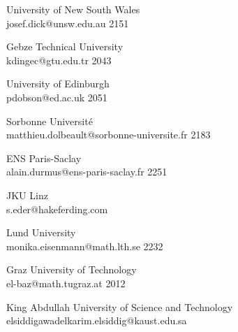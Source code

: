 \begin{multicols}{2}
 {University of New South Wales\\}%
 {josef.dick@unsw.edu.au}%
 {2151} %
 {} %
 {} %
 {} %
 {} %

 {Gebze Technical University\\}%
 {kdingec@gtu.edu.tr}%
 {2043} %
 {} %
 {} %
 {} %
 {} %

 {University of Edinburgh\\}%
 {pdobson@ed.ac.uk}%
 {2051} %
 {} %
 {} %
 {} %
 {} %

 {Sorbonne Universit\'e\\}%
 {matthieu.dolbeault@sorbonne-universite.fr}%
 {2183} %
 {} %
 {} %
 {} %
 {} %

 {ENS Paris-Saclay\\}%
 {alain.durmus@ens-paris-saclay.fr}%
 {2251} %
 {} %
 {} %
 {} %
 {} %

 {JKU Linz\\}%
 {s.eder@hakeferding.com}%
 {} %
 {} %
 {} %
 {} %
 {} %

 {Lund University\\}%
 {monika.eisenmann@math.lth.se}%
 {2232} %
 {} %
 {} %
 {} %
 {} %

 {Graz University of Technology\\}%
 {el-baz@math.tugraz.at}%
 {2012} %
 {} %
 {} %
 {} %
 {} %

 {King Abdullah University of Science and Technology\\}%
 {elsiddigawadelkarim.elsiddig@kaust.edu.sa}%
 {} %
 {} %
 {} %
 {} %
 {} %


\end{multicols}
